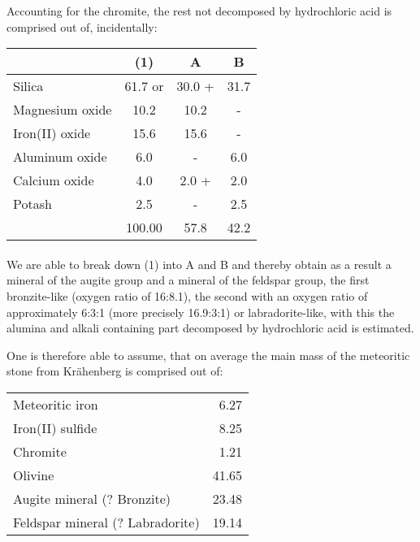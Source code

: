\documentclass[a4paper, 12pt, oneside]{article}
\begin{document}
Accounting for the chromite, the rest not decomposed by hydrochloric acid is comprised out of, incidentally:
\begin{center}
    \begin{tabular}{ |l|c|c|c| }
        \hline
        & (1) & A & B\\\hline
        Silica & 61.7 or & 30.0 + & 31.7\\\hline
        Magnesium oxide & 10.2 & 10.2 & -\\\hline
        Iron(II) oxide & 15.6 & 15.6 & -\\\hline
        Aluminum oxide & 6.0 & - & 6.0\\\hline
        Calcium oxide & 4.0 & 2.0 + & 2.0\\\hline
        Potash & 2.5 & - & 2.5\\\hline
        & 100.00 & 57.8 & 42.2\\
        \hline
    \end{tabular}
\end{center}
\paragraph*{}
We are able to break down (1) into A and B and thereby obtain as a result a mineral of the augite group and a mineral of the feldspar group, the first bronzite-like (oxygen ratio of 16:8.1), the second with an oxygen ratio of approximately 6:3:1 (more precisely 16.9:3:1) or labradorite-like, with this the alumina and alkali containing part decomposed by hydrochloric acid is estimated.

One is therefore able to assume, that on average the main mass of the meteoritic stone from Krähenberg is comprised out of:
\begin{center}
    \begin{tabular}{l r}
        Meteoritic iron & 6.27\\
        Iron(II) sulfide & 8.25\\
        Chromite & 1.21\\
        Olivine & 41.65\\
        Augite mineral (? Bronzite) & 23.48\\
        Feldspar mineral (? Labradorite) & 19.14\\
    \end{tabular}
\end{center}
\end{document}
